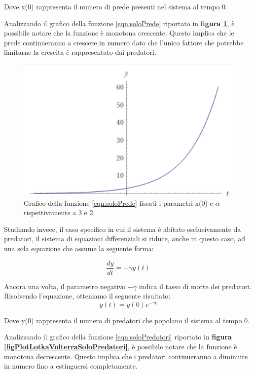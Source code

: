 \documentclass[11pt]{article}
\begin{document}
\noindent Dove x(0) rappresenta il numero di prede presenti nel sistema al tempo 0.

\noindent Analizzando il grafico della funzione \eqref{eqn:soloPrede} riportato in \textbf{figura \ref{figPlotLotkaVolterraSoloPrede}}, è possibile notare che la funzione è monotona crescente. Questo implica che le prede continueranno a crescere in numero dato che l'unico fattore che potrebbe limitarne la crescita è rappresentato dai predatori. 

\begin{figure}[h]
    \centering
    \includegraphics[scale = 1]{plotSoloPrede.PNG}
    \caption{Grafico della funzione \eqref{eqn:soloPrede} fissati i parametri x(0) e $\alpha$ rispettivamente a 3 e 2}
    \label{figPlotLotkaVolterraSoloPrede}
\end{figure}

\noindent Studiando invece, il caso specifico in cui il sistema è abitato esclusivamente da predatori, il sistema di equazioni differenziali si riduce, anche in questo caso, ad una sola equazione che assume la seguente forma: 

\[
    \frac{dy}{dt} = -\gamma y(t) 
\]

Ancora una volta, il parametro negativo $-\gamma$ indica il tasso di morte dei predatori. 
Risolvendo l'equazione, otteniamo il seguente risultato:
\begin{equation}\label{eqn:soloPredatori}
    y(t) = y(0)e^{-\gamma t}
\end{equation}

\noindent Dove y(0) rappresenta il numero di predatori che popolano il sistema al tempo 0.

\noindent Analizzando il grafico della funzione \eqref{eqn:soloPredatori} riportato in \textbf{figura \ref{figPlotLotkaVolterraSoloPredatori}}, è possibile notare che la funzione è monotona decrescente. Questo implica che i predatori continueranno a diminuire in numero fino a estinguersi completamente. 
\end{document}
